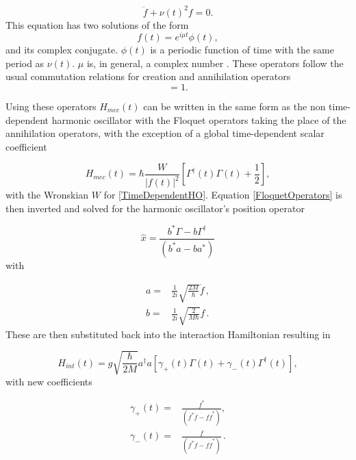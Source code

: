 \documentclass[reprint, amsmath,amssymb, aps,pra]{revtex4-1}
\begin{document}
\begin{equation} \label{TimeDependentHO}
\ddot{f} + \nu(t)^2f=0.
\end{equation} This equation has two solutions \cite{HanngiFM} of the form
\begin{equation}
f(t) = e^{i\mu t}\phi(t), 
\end{equation} and its complex conjugate. $\phi(t)$ is a periodic function of time with the same period as $\nu(t)$.  $\mu$ is, in general, a complex number \cite{WardFT}. These operators follow the usual commutation relations for creation and annihilation operators
\begin{equation}
[\Gamma(t)^\dagger,\Gamma(t)]=1.
\end{equation}

 Using these operators $H_{mec}(t)$ can be written in the same form as the non time-dependent harmonic oscillator with the Floquet operators taking the place of the annihilation operators, with the exception of a global time-dependent scalar coefficient  \cite{BrownPT}

\begin{equation}
H_{mec}(t) = \hbar\frac{W}{|f(t)|^2}\left[\Gamma^\dagger(t)\Gamma(t) + \frac{1}{2}\right],
\end{equation}
with the Wronskian $W$ for \eqref{TimeDependentHO}. Equation
\eqref{FloquetOperators} is then inverted and solved for the harmonic
oscillator's position operator \cite{TesisMaestria}

\begin{equation}
\hat{x} = \frac{b^* \Gamma - b\Gamma^\dagger}{(b^*a-ba^*)}
\end{equation} with

\begin{align}
a =&  \frac{1}{2i}\sqrt{\frac{2M}{\hbar}}\dot{f}\, , \\
b =&  \frac{1}{2i}\sqrt{\frac{2}{M\hbar}}f\, .
\end{align}
These are then substituted back into the interaction Hamiltonian
resulting in

\begin{equation}
H_{int}(t) = g\sqrt{\frac{\hbar}{2M}}a^\dagger a[\gamma_+(t)\Gamma (t) +\gamma_-(t)\Gamma^\dagger (t)],
\end{equation} with new coefficients

\begin{align*}
\gamma_+(t)=&\frac{f^*}{(f^*\dot{f}-f\dot{f}^*)},\\
\gamma_-(t)=&\frac{f}{(f^*\dot{f}-f\dot{f}^*)}\, .
\end{align*} 
\end{document}

